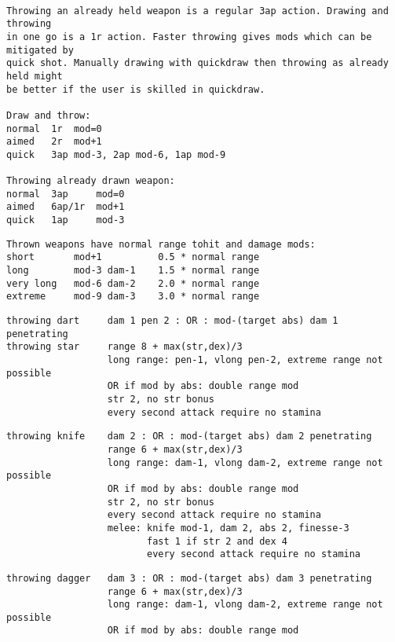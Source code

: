 \

\goodbreak \small \begin{samepage} \begin{verbatim}
Throwing an already held weapon is a regular 3ap action. Drawing and throwing
in one go is a 1r action. Faster throwing gives mods which can be mitigated by
quick shot. Manually drawing with quickdraw then throwing as already held might
be better if the user is skilled in quickdraw.

Draw and throw:
normal  1r  mod=0
aimed   2r  mod+1
quick   3ap mod-3, 2ap mod-6, 1ap mod-9

Throwing already drawn weapon:
normal  3ap     mod=0
aimed   6ap/1r  mod+1
quick   1ap     mod-3
\end{verbatim} \blocklistgap \begin{verbatim}
Thrown weapons have normal range tohit and damage mods:
short       mod+1          0.5 * normal range
long        mod-3 dam-1    1.5 * normal range
very long   mod-6 dam-2    2.0 * normal range
extreme     mod-9 dam-3    3.0 * normal range
\end{verbatim} \blocklistgap \begin{verbatim}
throwing dart     dam 1 pen 2 : OR : mod-(target abs) dam 1 penetrating
throwing star     range 8 + max(str,dex)/3
                  long range: pen-1, vlong pen-2, extreme range not possible
                  OR if mod by abs: double range mod
                  str 2, no str bonus
                  every second attack require no stamina
\end{verbatim} \blocklistgap \begin{verbatim}
throwing knife    dam 2 : OR : mod-(target abs) dam 2 penetrating
                  range 6 + max(str,dex)/3
                  long range: dam-1, vlong dam-2, extreme range not possible
                  OR if mod by abs: double range mod
                  str 2, no str bonus
                  every second attack require no stamina
                  melee: knife mod-1, dam 2, abs 2, finesse-3
                         fast 1 if str 2 and dex 4
                         every second attack require no stamina
\end{verbatim} \blocklistgap \begin{verbatim}
throwing dagger   dam 3 : OR : mod-(target abs) dam 3 penetrating
                  range 6 + max(str,dex)/3
                  long range: dam-1, vlong dam-2, extreme range not possible
                  OR if mod by abs: double range mod

\end{verbatim}
\end{samepage}
